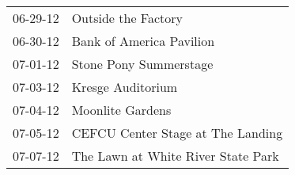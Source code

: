 \begin{supertabular}{p{0.25\columnwidth}p{0.75\columnwidth}}
 06-29-12 &                 Outside the Factory \\
 06-30-12 &            Bank of America Pavilion \\
 07-01-12 &              Stone Pony Summerstage \\
 07-03-12 &                   Kresge Auditorium \\
 07-04-12 &                    Moonlite Gardens \\
 07-05-12 &   CEFCU Center Stage at The Landing \\
 07-07-12 &  The Lawn at White River State Park \\
\end{supertabular}
